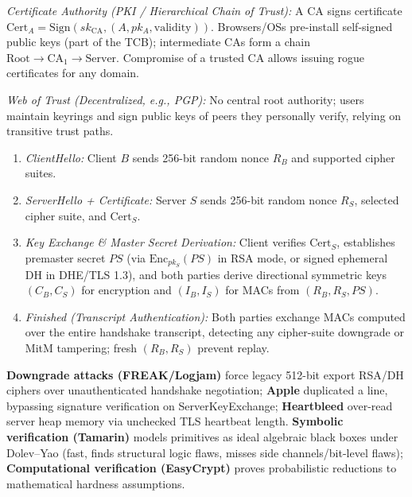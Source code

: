 \begin{compactitem}
  \item {}
  \begin{compactitem}
    \item \emph{Certificate Authority (PKI / Hierarchical Chain of Trust):} A CA signs certificate $\mathrm{Cert}_A = \mathrm{Sign}(sk_{\text{CA}}, (A, pk_A, \text{validity}))$. Browsers/OSs pre-install self-signed  public keys (part of the TCB); intermediate CAs form a chain $\text{Root} \to \text{CA}_1 \to \text{Server}$. Compromise of a trusted CA allows issuing rogue certificates for any domain.
    \item \emph{Web of Trust (Decentralized, e.g., PGP):} No central root authority; users maintain keyrings and sign public keys of peers they personally verify, relying on transitive trust paths.
  \end{compactitem}
  \item {}
  \begin{enumerate}[label=\arabic*., leftmargin=1.5em]
    \item \emph{ClientHello:} Client $B$ sends 256-bit random nonce $R_B$ and supported cipher suites.
    \item \emph{ServerHello + Certificate:} Server $S$ sends 256-bit random nonce $R_S$, selected cipher suite, and $\mathrm{Cert}_S$.
    \item \emph{Key Exchange \& Master Secret Derivation:} Client verifies $\mathrm{Cert}_S$, establishes premaster secret $PS$ (via $\mathrm{Enc}_{pk_S}(PS)$ in RSA mode, or signed ephemeral DH in DHE/TLS 1.3), and both parties derive directional symmetric keys $(C_B, C_S)$ for encryption and $(I_B, I_S)$ for MACs from $(R_B, R_S, PS)$.
    \item \emph{Finished (Transcript Authentication):} Both parties exchange MACs computed over the entire handshake transcript, detecting any cipher-suite downgrade or MitM tampering; fresh $(R_B, R_S)$ prevent replay.
  \end{enumerate}
   \textbf{Downgrade attacks (FREAK/Logjam)} force legacy 512-bit export RSA/DH ciphers over unauthenticated handshake negotiation; \textbf{Apple } duplicated a  line, bypassing signature verification on ServerKeyExchange; \textbf{Heartbleed} over-read server heap memory via unchecked TLS heartbeat length. \textbf{Symbolic verification (Tamarin)} models primitives as ideal algebraic black boxes under Dolev--Yao (fast, finds structural logic flaws, misses side channels/bit-level flaws); \textbf{Computational verification (EasyCrypt)} proves probabilistic reductions to mathematical hardness assumptions.
\end{compactitem}

